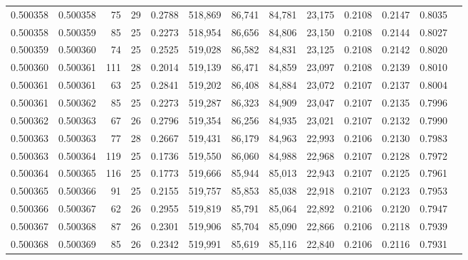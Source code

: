 \begin{tabular}{rrrrrrrrrrrrr}
0.500358 & 0.500358 &  75 &  29 &                                     0.2788 & 518,869 &  86,741 &  84,781 &  23,175 & 0.2108 & 0.2147 & 0.8035 \\
0.500358 & 0.500359 &  85 &  25 &                                     0.2273 & 518,954 &  86,656 &  84,806 &  23,150 & 0.2108 & 0.2144 & 0.8027 \\
0.500359 & 0.500360 &  74 &  25 &                                     0.2525 & 519,028 &  86,582 &  84,831 &  23,125 & 0.2108 & 0.2142 & 0.8020 \\
0.500360 & 0.500361 & 111 &  28 &                                     0.2014 & 519,139 &  86,471 &  84,859 &  23,097 & 0.2108 & 0.2139 & 0.8010 \\
0.500361 & 0.500361 &  63 &  25 &                                     0.2841 & 519,202 &  86,408 &  84,884 &  23,072 & 0.2107 & 0.2137 & 0.8004 \\
0.500361 & 0.500362 &  85 &  25 &                                     0.2273 & 519,287 &  86,323 &  84,909 &  23,047 & 0.2107 & 0.2135 & 0.7996 \\
0.500362 & 0.500363 &  67 &  26 &                                     0.2796 & 519,354 &  86,256 &  84,935 &  23,021 & 0.2107 & 0.2132 & 0.7990 \\
0.500363 & 0.500363 &  77 &  28 &                                     0.2667 & 519,431 &  86,179 &  84,963 &  22,993 & 0.2106 & 0.2130 & 0.7983 \\
0.500363 & 0.500364 & 119 &  25 &                                     0.1736 & 519,550 &  86,060 &  84,988 &  22,968 & 0.2107 & 0.2128 & 0.7972 \\
0.500364 & 0.500365 & 116 &  25 &                                     0.1773 & 519,666 &  85,944 &  85,013 &  22,943 & 0.2107 & 0.2125 & 0.7961 \\
0.500365 & 0.500366 &  91 &  25 &                                     0.2155 & 519,757 &  85,853 &  85,038 &  22,918 & 0.2107 & 0.2123 & 0.7953 \\
0.500366 & 0.500367 &  62 &  26 &                                     0.2955 & 519,819 &  85,791 &  85,064 &  22,892 & 0.2106 & 0.2120 & 0.7947 \\
0.500367 & 0.500368 &  87 &  26 &                                     0.2301 & 519,906 &  85,704 &  85,090 &  22,866 & 0.2106 & 0.2118 & 0.7939 \\
0.500368 & 0.500369 &  85 &  26 &                                     0.2342 & 519,991 &  85,619 &  85,116 &  22,840 & 0.2106 & 0.2116 & 0.7931 \\

\end{tabular}
